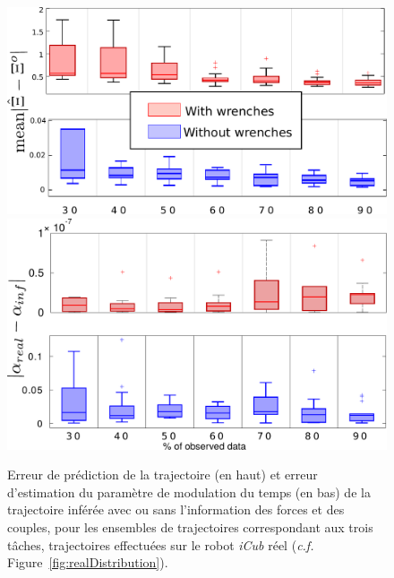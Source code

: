 \documentclass[utf8]{frontiersSCNS} %
\newcommand{\todo}[1]{\textcolor{red}{\textbf{/*#1*/}}}
\begin{document}
\begin{figure}[!h]
\centering
{
\includegraphics[width=12cm]{img/errBoxWithWithoutForces.pdf}\\
\includegraphics[width=12cm]{img/boxAlphaErrorWithForces.pdf}
}
\caption{Erreur de prédiction de la trajectoire (en haut) et erreur d'estimation du paramètre de modulation du temps (en bas) de la trajectoire inférée avec ou sans l'information des forces et des couples, pour les ensembles de trajectoires correspondant aux trois tâches, trajectoires effectuées sur le robot \textit{iCub} réel (\textit{c.f.} Figure~\ref{fig:realDistribution}).}
\label{fig:errBoxWithWithoutForces}
\end{figure}

\end{document}
